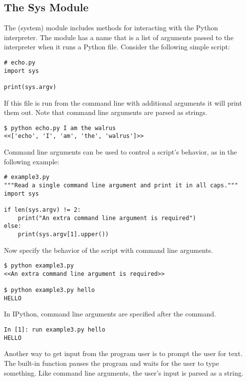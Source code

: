 \subsection*{The Sys Module} %

The  (system) module includes methods for interacting with the Python interpreter.
The module has a name  that is a list of arguments passed to the interpreter when it runs a Python file.
Consider the following simple script:

\begin{lstlisting}
# echo.py
import sys

print(sys.argv)
\end{lstlisting}

If this file is run from the command line with additional arguments it will print them out.
Note that command line arguments are parsed as strings.

\begin{lstlisting}
$ python echo.py I am the walrus
<<['echo', 'I', 'am', 'the', 'walrus']>>
\end{lstlisting}

Command line arguments can be used to control a script's behavior, as in the following example:

\begin{lstlisting}
# example3.py
"""Read a single command line argument and print it in all caps."""
import sys

if len(sys.argv) != 2:
    print("An extra command line argument is required")
else:
    print(sys.argv[1].upper())
\end{lstlisting}

Now specify the behavior of the script with command line arguments.

\begin{lstlisting}
$ python example3.py
<<An extra command line argument is required>>

$ python example3.py hello
HELLO
\end{lstlisting}

In IPython, command line arguments are specified after the  command.

\begin{lstlisting}
In [1]: run example3.py hello
HELLO
\end{lstlisting}

Another way to get input from the program user is to prompt the user for text.
The built-in function  pauses the program and waits for the user to type something.
Like command line arguments, the user's input is parsed as a string.

